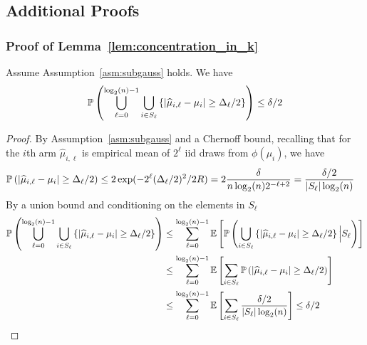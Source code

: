 
\subsection{Additional Proofs}\label{sec:appendix_upper_lemmas}
\subsubsection{Proof of Lemma~\ref{lem:concentration_in_k}}\label{sec:concentration_in_k_proof}
\begin{lemma}
Assume Assumption~\ref{asm:subgauss} holds.
We have
\begin{align*}
\P\left( \bigcup_{\ell=0}^{\log_2(n)-1} \bigcup_{i \in S_{\ell}} \left\{ |\widehat{\mu}_{i,\ell} - \mu_i| \geq \Delta_\ell/2 \right\} \right) \leq \delta/2
\end{align*}
\end{lemma}
\begin{proof}
By Assumption~\ref{asm:subgauss} and a Chernoff bound, recalling that for the $i$th arm $\widehat{\mu}_{i,\ell}$ is empirical mean of $2^\ell$ iid draws from $\phi(\mu_i)$, we have 
\begin{align*}
\P\left( |\widehat{\mu}_{i,\ell} - \mu_i| \geq \Delta_\ell/2 \right) &\leq 2 \exp( -2^{\ell} (\Delta_\ell/2)^2/2 R ) = 2 \frac{\delta}{n \log_2(n) 2^{-\ell+2}} = \frac{\delta /2}{ |S_\ell| \log_2(n)}
\end{align*}
By a union bound and conditioning on the elements in $S_\ell$
\begin{align*}
\P\left( \bigcup_{\ell=0}^{\log_2(n)-1} \bigcup_{i \in S_{\ell}} \left\{ |\widehat{\mu}_{i,\ell} - \mu_i| \geq \Delta_\ell/2 \right\} \right)  &\leq \sum_{\ell=0}^{\log_2(n)-1} \E\left[ \P\left( \bigcup_{i \in S_{\ell}} \left\{ |\widehat{\mu}_{i,\ell} - \mu_i| \geq \Delta_\ell/2 \right\} \Big| S_\ell \right) \right] \\ 
&\leq \sum_{\ell=0}^{\log_2(n)-1} \E\left[  \sum_{i \in S_{\ell}} \P\left( |\widehat{\mu}_{i,\ell} - \mu_i| \geq \Delta_\ell/2 \right) \right] \\
&\leq \sum_{\ell=0}^{\log_2(n)-1} \E\left[  \sum_{i \in S_{\ell}} \frac{\delta /2}{ |S_\ell| \log_2(n)} \right]  \leq \delta/2
\end{align*}

\end{proof}

